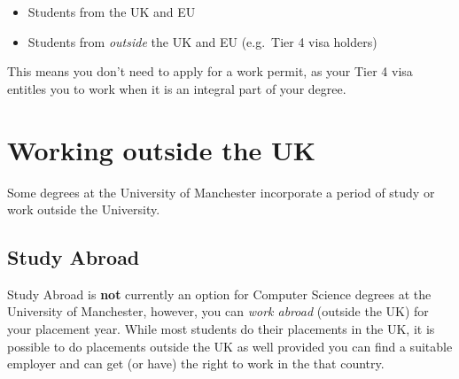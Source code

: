 \documentclass[
]{book}
\providecommand{\tightlist}{%
  \setlength{\itemsep}{0pt}\setlength{\parskip}{0pt}}
\begin{document}
\begin{itemize}
\tightlist
\item
  Students from the UK and EU
\item
  Students from \emph{outside} the UK and EU (e.g.~Tier 4 visa holders)
\end{itemize}

This means you don't need to apply for a work permit, as your Tier 4 visa entitles you to work when it is an integral part of your degree.

\chapter{Working outside the UK}\label{notuk}

Some degrees at the University of Manchester incorporate a period of study or work outside the University. \citep{studyabroad}

\section{Study Abroad}\label{abroad}

Study Abroad is \textbf{not} currently an option for Computer Science degrees at the University of Manchester, however, you can \emph{work abroad} (outside the UK) for your placement year. While most students do their placements in the UK, it is possible to do placements outside the UK as well provided you can find a suitable employer and can get (or have) the right to work in the that country.
\end{document}
